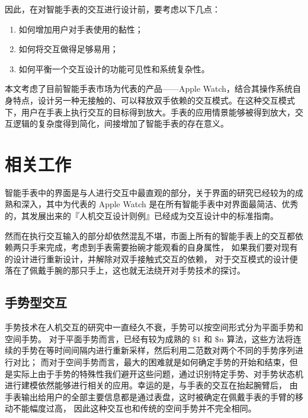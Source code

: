 因此，在对智能手表的交互进行设计前，要考虑以下几点：

\begin{enumerate}
    \kaishu
    \item 如何增加用户对手表使用的黏性；
    \item 如何将交互做得足够易用；
    \item 如何平衡一个交互设计的功能可见性和系统复杂性。
\end{enumerate}

本文考虑了目前智能手表市场为代表的产品——Apple Watch，结合其操作系统自身特点，设计另一种无接触的、可以释放双手依赖的交互模式。在这种交互模式下，用户在手表上执行交互的目标得到放大。手表的应用情景能够被得到放大，交互逻辑的复杂度得到简化，间接增加了智能手表的存在意义。

\section{相关工作}

智能手表中的界面是与人进行交互中最直观的部分\cite{liuheng2015}，关于界面的研究已经较为的成熟和深入\cite{chengshiwei2009,fuaiming2006}，其中为代表的 Apple Watch 是在所有智能手表中对界面最简洁、优秀的，其发展出来的『人机交互设计则例』\cite{WatchGuidelines:2016}已经成为交互设计中的标准指南。

然而在执行交互输入的部分却依然混乱不堪，市面上所有的智能手表上的交互都依赖两只手来完成，考虑到手表需要抬碗才能观看的自身属性，
如果我们要对现有的设计进行重新设计，并解除对双手接触式交互的依赖，
对于交互模式的设计便落在了佩戴手腕的那只手上，这也就无法绕开对手势技术的探讨。

\subsection{手势型交互}

手势技术在人机交互的研究中一直经久不衰，手势可以按空间形式分为平面手势和空间手势。
对于平面手势而言，已经有较为成熟的 $\$1$ \cite{wobbrock2007gestures}
和 $\$n$ \cite{anthony2010lightweight}算法，这些方法将连续的手势在等时间间隔内进行重新采样，然后利用二范数对两个不同的手势序列进行对比；
而对于空间手势而言，最大的困难就是如何确定手势的开始和结束，但是实际上由于手势的特殊性我们避开这些问题，通过识别特定手势、对手势状态机进行建模依然能够进行相关的应用\cite{liuqingshui2002,chenyaxi2014,dihaijin2011,houwenjun2015,Vatavu:2014:LGT:2602299.2602316}。幸运的是，与手表的交互在抬起腕臂后，
由手表输出给用户的全部主要信息都是通过表盘，这时被确定在佩戴手表的手臂的移动不能幅度过高，
因此这种交互也和传统的空间手势并不完全相同。

